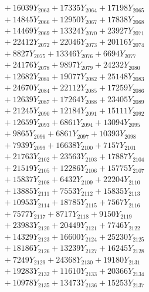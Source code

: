 \documentclass[a4paper,10pt]{article}
\begin{document}
{\begin{align}
&\;  + 16039 Y_{2063} + 17335 Y_{2064} + 17198 Y_{2065} \\[0.3ex]
&\;  + 14845 Y_{2066} + 12950 Y_{2067} + 17838 Y_{2068} \\[0.5ex]\allowbreak
&\;  + 14469 Y_{2069} + 13324 Y_{2070} + 23927 Y_{2071} \\[0.3ex]
&\;  + 22412 Y_{2072} + 22046 Y_{2073} + 20116 Y_{2074} \\[0.3ex]
&\;  + 8827 Y_{2075} + 13346 Y_{2076} + 6694 Y_{2077} \\[0.3ex]
&\;  + 24176 Y_{2078} + 9897 Y_{2079} + 24232 Y_{2080} \\[0.3ex]
&\;  + 12682 Y_{2081} + 19077 Y_{2082} + 25148 Y_{2083} \\[0.3ex]
&\;  + 24670 Y_{2084} + 22112 Y_{2085} + 17259 Y_{2086} \\[0.3ex]
&\;  + 12639 Y_{2087} + 17264 Y_{2088} + 23405 Y_{2089} \\[0.3ex]
&\;  + 21245 Y_{2090} + 12184 Y_{2091} + 15111 Y_{2092} \\[0.3ex]
&\;  + 12659 Y_{2093} + 6861 Y_{2094} + 13094 Y_{2095} \\[0.3ex]
&\;  + 9865 Y_{2096} + 6861 Y_{2097} + 10393 Y_{2098} \\[0.5ex]\allowbreak
&\;  + 7939 Y_{2099} + 16638 Y_{2100} + 7157 Y_{2101} \\[0.3ex]
&\;  + 21763 Y_{2102} + 23563 Y_{2103} + 17887 Y_{2104} \\[0.3ex]
&\;  + 21519 Y_{2105} + 12286 Y_{2106} + 15775 Y_{2107} \\[0.3ex]
&\;  + 15837 Y_{2108} + 6432 Y_{2109} + 22204 Y_{2110} \\[0.3ex]
&\;  + 13885 Y_{2111} + 7553 Y_{2112} + 15835 Y_{2113} \\[0.3ex]
&\;  + 10953 Y_{2114} + 18785 Y_{2115} + 7567 Y_{2116} \\[0.3ex]
&\;  + 7577 Y_{2117} + 8717 Y_{2118} + 9150 Y_{2119} \\[0.3ex]
&\;  + 23983 Y_{2120} + 20449 Y_{2121} + 7746 Y_{2122} \\[0.3ex]
&\;  + 14329 Y_{2123} + 16600 Y_{2124} + 25230 Y_{2125} \\[0.3ex]
&\;  + 18186 Y_{2126} + 13239 Y_{2127} + 16245 Y_{2128} \\[0.5ex]\allowbreak
&\;  + 7249 Y_{2129} + 24368 Y_{2130} + 19180 Y_{2131} \\[0.3ex]
&\;  + 19283 Y_{2132} + 11610 Y_{2133} + 20366 Y_{2134} \\[0.3ex]
&\;  + 10978 Y_{2135} + 13473 Y_{2136} + 15253 Y_{2137} \\[0.3ex]

\end{align}}
\end{document}
